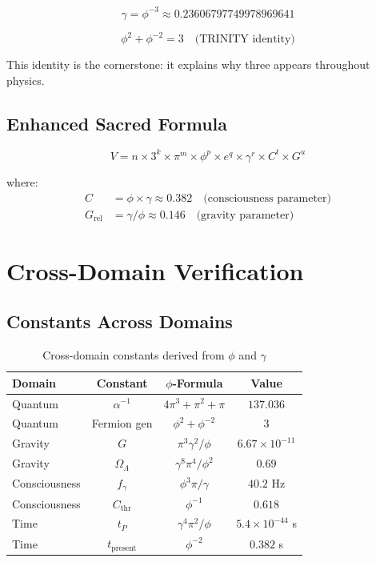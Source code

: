 \documentclass[12pt,a4paper]{article}
\begin{document}
\begin{equation}
\gamma = \phi^{-3} \approx 0.23606797749978969641
\end{equation}

\begin{equation}
\phi^2 + \phi^{-2} = 3 \quad \text{(TRINITY identity)}
\end{equation}

This identity is the cornerstone: it explains why three appears throughout physics.

\subsection{Enhanced Sacred Formula}

\begin{equation}
V = n \times 3^k \times \pi^m \times \phi^p \times e^q \times \gamma^r \times C^t \times G^u
\end{equation}

where:
\begin{align}
C &= \phi \times \gamma \approx 0.382 \quad \text{(consciousness parameter)} \\
G_{\text{rel}} &= \gamma / \phi \approx 0.146 \quad \text{(gravity parameter)}
\end{align}

\section{Cross-Domain Verification}

\subsection{Constants Across Domains}

\begin{table}[h]
\centering
\begin{tabular}{lccc}
\toprule
Domain & Constant & $\phi$-Formula & Value \\
\midrule
Quantum & $\alpha^{-1}$ & $4\pi^3 + \pi^2 + \pi$ & $137.036$ \\
Quantum & Fermion gen & $\phi^2 + \phi^{-2}$ & $3$ \\
Gravity & $G$ & $\pi^3\gamma^2/\phi$ & $6.67 \times 10^{-11}$ \\
Gravity & $\Omega_\Lambda$ & $\gamma^8\pi^4/\phi^2$ & $0.69$ \\
Consciousness & $f_\gamma$ & $\phi^3\pi/\gamma$ & $40.2$ Hz \\
Consciousness & $C_{\text{thr}}$ & $\phi^{-1}$ & $0.618$ \\
Time & $t_P$ & $\gamma^4\pi^2/\phi$ & $5.4 \times 10^{-44}$ s \\
Time & $t_{\text{present}}$ & $\phi^{-2}$ & $0.382$ s \\
\bottomrule
\end{tabular}
\caption{Cross-domain constants derived from $\phi$ and $\gamma$}
\end{table}
\end{document}
